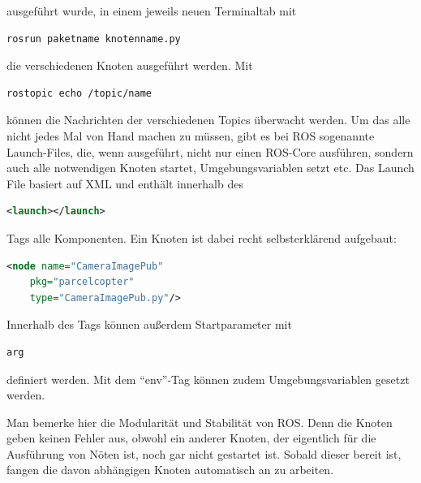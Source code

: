 ausgeführt wurde, in einem jeweils neuen Terminaltab mit 

\begin{lstlisting}[language=bash]
rosrun paketname knotenname.py
\end{lstlisting}

die verschiedenen Knoten ausgeführt werden. Mit 

\begin{lstlisting}[language=bash]
rostopic echo /topic/name
\end{lstlisting}

können die Nachrichten der verschiedenen Topics überwacht werden. Um das alle nicht jedes Mal von Hand machen zu müssen, gibt es bei ROS sogenannte Launch-Files, die, wenn ausgeführt, nicht nur einen ROS-Core ausführen, sondern auch alle notwendigen Knoten startet, Umgebungsvariablen setzt etc. Das Launch File basiert auf XML und enthält innerhalb des 

\begin{lstlisting}[language=xml]
<launch></launch>
\end{lstlisting}Tags alle Komponenten. Ein Knoten ist dabei recht selbsterklärend aufgebaut: 

\begin{lstlisting}[language=xml]
<node name="CameraImagePub" 
	pkg="parcelcopter" 
	type="CameraImagePub.py"/>\end{lstlisting}

Innerhalb des Tags können außerdem Startparameter mit 

\begin{lstlisting}[language=bash]
arg
\end{lstlisting}

definiert werden. Mit dem ``env''-Tag können zudem Umgebungsvariablen gesetzt werden.

Man bemerke hier die Modularität und Stabilität von ROS. Denn die Knoten geben keinen Fehler aus, obwohl ein anderer Knoten, der eigentlich für die Ausführung von Nöten ist, noch gar nicht gestartet ist. Sobald dieser bereit ist, fangen die davon abhängigen Knoten automatisch an zu arbeiten. 

